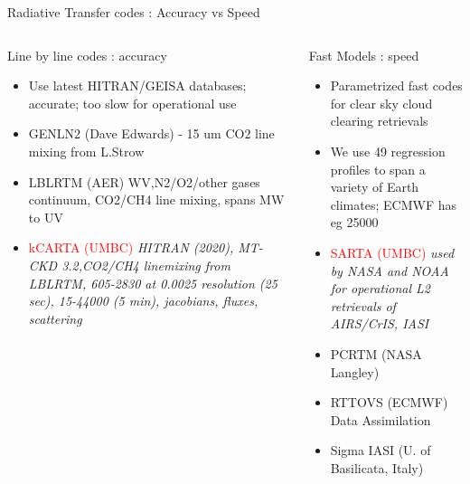 \documentclass[10pt,t]{beamer}
\begin{document}
\begin{frame}[shrink=2]{Radiative Transfer codes : Accuracy vs Speed}
\vspace{-0.1in}
\begin{columns}

\begin{column}{0.55\columnwidth}
\begin{block}{Line by line codes : accuracy}
  \begin{itemize}
  \item Use latest HITRAN/GEISA databases; accurate; too slow for operational use
  \item GENLN2 (Dave Edwards) - 15 um CO2 line mixing from L.Strow
  \item LBLRTM (AER) WV,N2/O2/other gases continuum, CO2/CH4 line mixing, spans MW to UV
  \item \textcolor{red}{kCARTA (UMBC)} \emph{HITRAN (2020), MT-CKD 3.2,CO2/CH4 linemixing from LBLRTM, 
        605-2830 \wn at 0.0025 \wn resolution (25 sec), 15-44000 \wn (5 min), jacobians, 
        fluxes, scattering}
  \end{itemize}
\end{block}
\end{column}

\begin{column}{0.55\columnwidth}
\begin{block}{Fast Models : speed}
  \begin{itemize}
  \item Parametrized fast codes for clear sky cloud clearing retrievals
  \item We use 49 regression profiles to span a variety of Earth climates; ECMWF has eg 25000
  \item \textcolor{red}{SARTA (UMBC)} \emph{used by NASA and NOAA for operational L2 retrievals of AIRS/CrIS, IASI}
  \item PCRTM (NASA Langley)
  \item RTTOVS (ECMWF) Data Assimilation
  \item Sigma IASI (U. of Basilicata, Italy) 
  \end{itemize}
\end{block}
\end{column}
\end{columns}
\end{frame}

\end{document}
